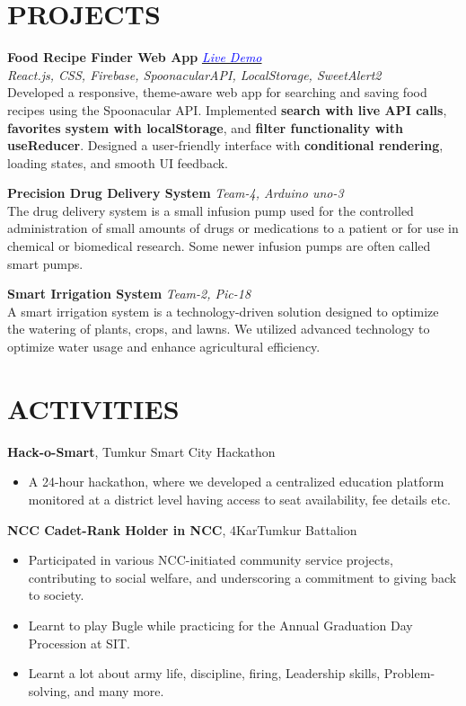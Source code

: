 \documentclass[a4paper,11pt]{article}
\begin{document}
\section{PROJECTS}
\textbf{Food Recipe Finder Web App} \hfill \textit{\href{https://react-food-app-2024-63519.web.app/}{\textcolor{blue}{Live Demo}}} \\
\textit{React.js, CSS, Firebase, SpoonacularAPI, LocalStorage, SweetAlert2} \\
Developed a responsive, theme-aware web app for searching and saving food recipes using the Spoonacular API. Implemented \textbf{search with live API calls}, \textbf{favorites system with localStorage}, and \textbf{filter functionality with useReducer}. Designed a user-friendly interface with \textbf{conditional rendering}, loading states, and smooth UI feedback.
\vspace{8pt}

\textbf{Precision Drug Delivery System} \hfill \textit{Team-4, Arduino uno-3} \\
The drug delivery system is a small infusion pump used for the controlled administration of small amounts of drugs or medications to a patient or for use in chemical or biomedical research. Some newer infusion pumps are often called smart pumps.
\vspace{8pt}

\textbf{Smart Irrigation System} \hfill \textit{Team-2, Pic-18} \\
A smart irrigation system is a technology-driven solution designed to optimize the watering of plants, crops, and lawns. We utilized advanced technology to optimize water usage and enhance agricultural efficiency.

\section{ACTIVITIES}
\textbf{Hack-o-Smart}, Tumkur Smart City Hackathon
\begin{itemize}
    \item A 24-hour hackathon, where we developed a centralized education platform monitored at a district level having access to seat availability, fee details etc.
\end{itemize}

\textbf{NCC Cadet-Rank Holder in NCC}, 4KarTumkur Battalion
\begin{itemize}
    \item Participated in various NCC-initiated community service projects, contributing to social welfare, and underscoring a commitment to giving back to society.
    \item Learnt to play Bugle while practicing for the Annual Graduation Day Procession at SIT.
    \item Learnt a lot about army life, discipline, firing, Leadership skills, Problem-solving, and many more.
\end{itemize}
\end{document}
